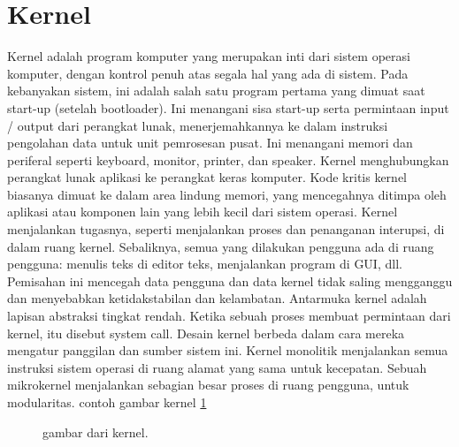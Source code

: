 
	
	\section{Kernel}
	 Kernel adalah program komputer yang merupakan inti dari sistem operasi komputer, dengan kontrol penuh atas segala hal yang ada di sistem. Pada kebanyakan sistem, ini adalah salah satu program pertama yang dimuat
	 saat start-up (setelah bootloader). 
	 Ini menangani sisa start-up serta permintaan input / output dari perangkat lunak, menerjemahkannya ke dalam instruksi pengolahan data untuk unit pemrosesan pusat. Ini menangani memori dan periferal seperti keyboard, 
	 monitor, printer, dan speaker.
	 Kernel menghubungkan perangkat lunak aplikasi ke perangkat keras komputer.
	 Kode kritis kernel biasanya dimuat ke dalam area lindung memori, yang mencegahnya ditimpa oleh aplikasi atau komponen lain yang lebih kecil dari sistem operasi. Kernel menjalankan tugasnya, seperti menjalankan proses 
	 dan penanganan interupsi, di dalam ruang kernel. 
	 Sebaliknya, semua yang dilakukan pengguna ada di ruang pengguna: menulis teks di editor teks, menjalankan program di GUI, dll. Pemisahan ini mencegah data pengguna dan data kernel tidak saling mengganggu dan menyebabkan 
	 ketidakstabilan dan kelambatan. 
	 Antarmuka kernel adalah lapisan abstraksi tingkat rendah. Ketika sebuah proses membuat permintaan dari kernel, itu disebut system call. Desain kernel berbeda dalam cara mereka mengatur panggilan dan sumber sistem ini. 
	 Kernel monolitik menjalankan semua instruksi sistem operasi di ruang alamat yang sama untuk kecepatan. Sebuah mikrokernel menjalankan sebagian besar proses di ruang pengguna, untuk modularitas. contoh gambar kernel \ref{kernel}
	
\begin{figure}[ht]
	\centerline{}
	\caption{gambar dari kernel.}
	\label{kernel}
\end{figure}


